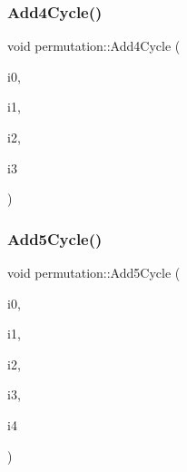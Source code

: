 \subsubsection{\texorpdfstring{Add4\+Cycle()}{Add4Cycle()}}
{\footnotesize\ttfamily void permutation\+::\+Add4\+Cycle (\begin{DoxyParamCaption}\item[{\mbox{\hyperlink{galois_8h_a09fddde158a3a20bd2dcadb609de11dc}{I\+NT}}}]{i0,  }\item[{\mbox{\hyperlink{galois_8h_a09fddde158a3a20bd2dcadb609de11dc}{I\+NT}}}]{i1,  }\item[{\mbox{\hyperlink{galois_8h_a09fddde158a3a20bd2dcadb609de11dc}{I\+NT}}}]{i2,  }\item[{\mbox{\hyperlink{galois_8h_a09fddde158a3a20bd2dcadb609de11dc}{I\+NT}}}]{i3 }\end{DoxyParamCaption})}

\mbox{\label{classpermutation_ac5767bfd7dbceb312865aff4a759d1a7}} 
\subsubsection{\texorpdfstring{Add5\+Cycle()}{Add5Cycle()}}
{\footnotesize\ttfamily void permutation\+::\+Add5\+Cycle (\begin{DoxyParamCaption}\item[{\mbox{\hyperlink{galois_8h_a09fddde158a3a20bd2dcadb609de11dc}{I\+NT}}}]{i0,  }\item[{\mbox{\hyperlink{galois_8h_a09fddde158a3a20bd2dcadb609de11dc}{I\+NT}}}]{i1,  }\item[{\mbox{\hyperlink{galois_8h_a09fddde158a3a20bd2dcadb609de11dc}{I\+NT}}}]{i2,  }\item[{\mbox{\hyperlink{galois_8h_a09fddde158a3a20bd2dcadb609de11dc}{I\+NT}}}]{i3,  }\item[{\mbox{\hyperlink{galois_8h_a09fddde158a3a20bd2dcadb609de11dc}{I\+NT}}}]{i4 }\end{DoxyParamCaption})}

\mbox{\label{classpermutation_a021494217208a3bacf9deba77484b70c}} 
